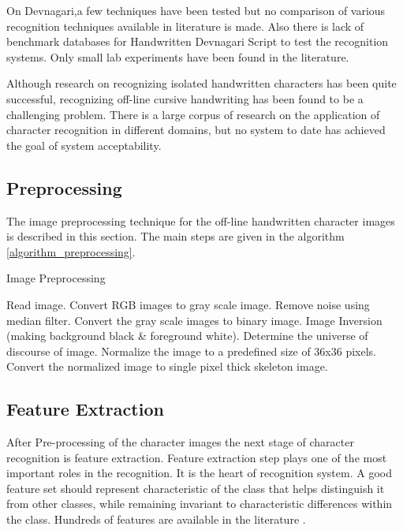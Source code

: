 \documentclass[12pt,a4paper,oneside]{article}
\numberwithin{equation}{section}
\numberwithin{algorithm}{section}
\begin{document}
On Devnagari,a few techniques have been tested but no comparison of various recognition techniques available in literature is made. Also there is lack of benchmark databases for Handwritten Devnagari Script to test the recognition systems. Only small lab experiments have been found in the literature.

Although research on recognizing isolated handwritten characters has been quite successful, recognizing off-line cursive handwriting has been found to be a challenging problem. There is a large corpus of research on the application of character recognition in different domains, but no system to date has achieved the goal of system acceptability.


\subsection{Preprocessing}
\label{preprocessing}
The image preprocessing technique \cite{Srikrishna2011} for the off-line handwritten character images is described in this section. The main steps are given in the algorithm \ref{algorithm_preprocessing}.

\begin{algorithm}
\caption{Image Preprocessing}
\label{algorithm_preprocessing}
\begin{algorithmic}[1]
\STATE  Read image.
\STATE  Convert RGB images to gray scale image.
\STATE  Remove noise using median filter.
\STATE  Convert the gray scale images to binary image.
\STATE	Image Inversion (making background black \& foreground white).
\STATE  Determine the universe of discourse of image.
\STATE  Normalize the image to a predefined size of 36x36 pixels.
\STATE  Convert the normalized image to single pixel thick skeleton image.
\end{algorithmic}
\end{algorithm}

\subsection{Feature Extraction}
\label{feature_extraction}
After Pre-processing of the character images the next stage of character recognition is feature extraction. Feature extraction step plays one of the most important roles in the recognition. It is the heart of recognition system. A good feature set should represent  characteristic of the class that helps distinguish it from other classes, while remaining invariant to characteristic differences within the class. Hundreds of features are available in the literature \cite{Jain1996,Jain2000}.
\end{document}
